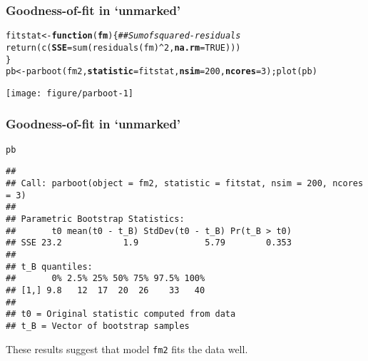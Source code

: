 \documentclass[color=usenames,dvipsnames]{beamer}\usepackage[]{graphicx}\usepackage[]{xcolor}
\makeatletter
\newcommand{\hlnum}[1]{\textcolor[rgb]{0.69,0.494,0}{#1}}%
\newcommand{\hlcom}[1]{\textcolor[rgb]{0.514,0.506,0.514}{\textit{#1}}}%
\newcommand{\hlopt}[1]{\textcolor[rgb]{0,0,0}{#1}}%
\newcommand{\hldef}[1]{\textcolor[rgb]{0,0,0}{#1}}%
\newcommand{\hlkwa}[1]{\textcolor[rgb]{0,0,0}{\textbf{#1}}}%
\newcommand{\hlkwb}[1]{\textcolor[rgb]{0,0.341,0.682}{#1}}%
\newcommand{\hlkwc}[1]{\textcolor[rgb]{0,0,0}{\textbf{#1}}}%
\newcommand{\hlkwd}[1]{\textcolor[rgb]{0.004,0.004,0.506}{#1}}%
\newenvironment{kframe}{%
 \def\at@end@of@kframe{}%
 \ifinner\ifhmode%
  \def\at@end@of@kframe{\end{minipage}}%
  \begin{minipage}{\columnwidth}%
 \fi\fi%
 \def\FrameCommand##1{\hskip\@totalleftmargin \hskip-\fboxsep
 \colorbox{shadecolor}{##1}\hskip-\fboxsep
     \hskip-\linewidth \hskip-\@totalleftmargin \hskip\columnwidth}%
 \MakeFramed {\advance\hsize-\width
   \@totalleftmargin\z@ \linewidth\hsize
   \@setminipage}}%
 {\par\unskip\endMakeFramed%
 \at@end@of@kframe}
\newenvironment{knitrout}{}{} %
\newcommand{\inr}[1]{\colorbox{inlinecolor}{\texttt{#1}}}
\makeatother
\begin{document}
\begin{frame}[fragile]
  \frametitle{Goodness-of-fit in `unmarked'}
\begin{knitrout}\scriptsize
{}\color{fgcolor}\begin{kframe}
\begin{alltt}
\hldef{fitstat} \hlkwb{<-} \hlkwa{function}\hldef{(}\hlkwc{fm}\hldef{) \{} \hlcom{## Sum of squared-residuals}
    \hlkwd{return}\hldef{(}\hlkwd{c}\hldef{(}\hlkwc{SSE}\hldef{=}\hlkwd{sum}\hldef{(}\hlkwd{residuals}\hldef{(fm)}\hlopt{^}\hlnum{2}\hldef{,} \hlkwc{na.rm}\hldef{=}\hlnum{TRUE}\hldef{)))}
\hldef{\}}
\hldef{pb} \hlkwb{<-} \hlkwd{parboot}\hldef{(fm2,} \hlkwc{statistic}\hldef{=fitstat,} \hlkwc{nsim}\hldef{=}\hlnum{200}\hldef{,} \hlkwc{ncores}\hldef{=}\hlnum{3}\hldef{);} \hlkwd{plot}\hldef{(pb)}
\end{alltt}
\end{kframe}

{\centering \texttt{[image: figure/parboot-1]} 

}


\end{knitrout}
\end{frame}



\begin{frame}[fragile]
  \frametitle{Goodness-of-fit in `unmarked'}
\begin{knitrout}\scriptsize
{}\color{fgcolor}\begin{kframe}
\begin{alltt}
\hldef{pb}
\end{alltt}
\begin{verbatim}
## 
## Call: parboot(object = fm2, statistic = fitstat, nsim = 200, ncores = 3)
## 
## Parametric Bootstrap Statistics:
##       t0 mean(t0 - t_B) StdDev(t0 - t_B) Pr(t_B > t0)
## SSE 23.2            1.9             5.79        0.353
## 
## t_B quantiles:
##       0% 2.5% 25% 50% 75% 97.5% 100%
## [1,] 9.8   12  17  20  26    33   40
## 
## t0 = Original statistic computed from data
## t_B = Vector of bootstrap samples
\end{verbatim}
\end{kframe}
\end{knitrout}
\vfill
These results suggest that model \inr{fm2} fits the data well.
\end{frame}
\end{document}
